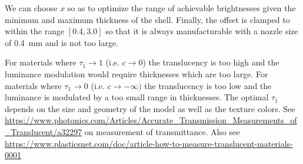 We can choose $x$ so as to optimize the range of achievable brightnesses given the minimum and maximum thickness of the shell.
Finally, the offset is clamped to within the range $[0.4, 3.0]$ so that it is always manufacturable with a nozzle size of \SI{0.4}{\milli\meter} and is not too large.

For materials where $\tau_1 \to 1$ (i.e. $c \to 0$) the translucency is too high and the luminance modulation would require thicknesses which are too large.
For materials where $\tau_1 \to 0$ (i.e. $c \to -\infty)$ the translucency is too low and the luminance is modulated by a too small range in thicknesses.
The optimal $\tau_1$ depends on the size and geometry of the model as well as the texture colors.
See \url{https://www.photonics.com/Articles/Accurate_Transmission_Measurements_of_Translucent/a32297} on measurement of transmittance.
Also see \url{https://www.plasticsnet.com/doc/article-how-to-measure-translucent-materials-0001}
